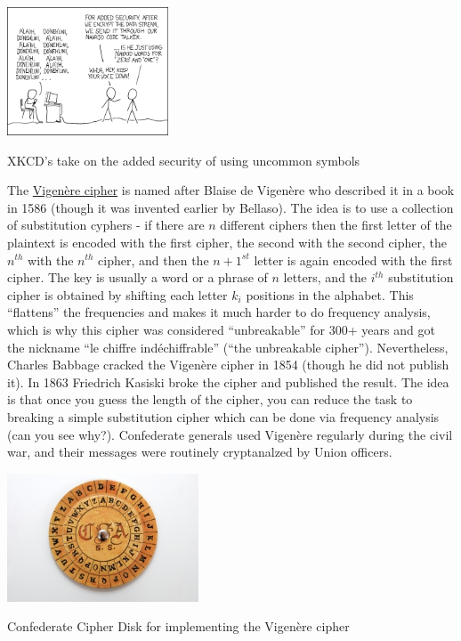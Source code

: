 \begin{marginfigure}
\centering
\includegraphics[width=\linewidth, height=1.5in, keepaspectratio]{../figure/code_talkers.png}
\caption{XKCD's take on the added security of using uncommon symbols}
\label{XKCDnavajofig}
\end{marginfigure}

The \href{https://en.wikipedia.org/wiki/Vigen\%C3\%A8re_cipher}{Vigenère
cipher} is named after Blaise de Vigenère who described it in a book in
1586 (though it was invented earlier by Bellaso). The idea is to use a
collection of substitution cyphers - if there are \(n\) different
ciphers then the first letter of the plaintext is encoded with the first
cipher, the second with the second cipher, the \(n^{th}\) with the
\(n^{th}\) cipher, and then the \(n+1^{st}\) letter is again encoded
with the first cipher. The key is usually a word or a phrase of \(n\)
letters, and the \(i^{th}\) substitution cipher is obtained by shifting
each letter \(k_i\) positions in the alphabet. This ``flattens'' the
frequencies and makes it much harder to do frequency analysis, which is
why this cipher was considered ``unbreakable'' for 300+ years and got
the nickname ``le chiffre indéchiffrable'' (``the unbreakable cipher'').
Nevertheless, Charles Babbage cracked the Vigenère cipher in 1854
(though he did not publish it). In 1863 Friedrich Kasiski broke the
cipher and published the result. The idea is that once you guess the
length of the cipher, you can reduce the task to breaking a simple
substitution cipher which can be done via frequency analysis (can you
see why?). Confederate generals used Vigenère regularly during the civil
war, and their messages were routinely cryptanalzed by Union officers.


\begin{marginfigure}
\centering
\includegraphics[width=\linewidth, height=1.5in, keepaspectratio]{../figure/confederate_cipher_disk.jpg}
\caption{Confederate Cipher Disk for implementing the Vigenère cipher}
\label{tmplabelfig}
\end{marginfigure}


